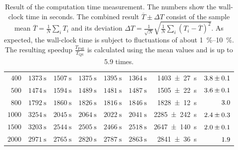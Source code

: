 \begin{table}[htbp]
\begin{tabular}{| r | r  r  r  r  r || r | r | }
$ \num{400} $ & $ \SI{1373}{\second} $ & $ \SI{1507}{\second} $ & $ \SI{1375}{\second} $ & $ \SI{1395}{\second} $ & $ \SI{1364}{\second} $ & \SI{1403 +- 27}{\second} & $ \num{3.8 +- 0.1} $ \\ 
$ \num{500} $ & $ \SI{1474}{\second} $ & $ \SI{1594}{\second} $ & $ \SI{1489}{\second} $ & $ \SI{1481}{\second} $ & $ \SI{1487}{\second} $ & \SI{1505 +- 22}{\second} & $ \num{3.6 +- 0.1} $ \\ 
$ \num{800} $ & $ \SI{1792}{\second} $ & $ \SI{1860}{\second} $ & $ \SI{1826}{\second} $ & $ \SI{1816}{\second} $ & $ \SI{1846}{\second} $ & \SI{1828 +- 12}{\second} & $ \num{3.0 +- 0.0} $ \\ 
$ \num{1000} $ & $ \SI{3254}{\second} $ & $ \SI{2045}{\second} $ & $ \SI{2064}{\second} $ & $ \SI{2022}{\second} $ & $ \SI{2041}{\second} $ & \SI{2285 +- 242}{\second} & $ \num{2.4 +- 0.3} $ \\ 
$ \num{1500} $ & $ \SI{3203}{\second} $ & $ \SI{2544}{\second} $ & $ \SI{2505}{\second} $ & $ \SI{2466}{\second} $ & $ \SI{2518}{\second} $ & \SI{2647 +- 140}{\second} & $ \num{2.0 +- 0.1} $ \\ 
$ \num{2000} $ & $ \SI{2971}{\second} $ & $ \SI{2765}{\second} $ & $ \SI{2820}{\second} $ & $ \SI{2787}{\second} $ & $ \SI{2863}{\second} $ & \SI{2841 +- 36}{\second} & $ \num{1.9 +- 0.0} $ \\ 

 

		\hline
	\end{tabular}
	\caption{Result of the computation time measurement. The numbers show the wall-clock time in seconds. The combined result $\overline{T} \pm \Delta T$ consist of the sample mean ${\overline{T} = \frac{1}{N} \sum_i T_i}$ and its deviation ${\Delta T = \frac{1}{\sqrt{N}} \sqrt{\frac{1}{N} \sum_i (T_i - \overline{T})^2}}$. As expected, the wall-clock time is subject to fluctuations of about \SIrange{1}{10}{\percent}. The resulting speedup $\frac{T_{\textrm{Full}}}{T_{\textrm{QS}}}$ is calculated using the mean values and is up to 5.9 times.}
	\label{tbl:timing_results}
\end{table}


